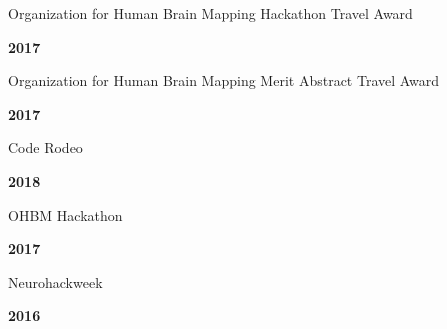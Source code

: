 \documentclass[10pt]{article}
\newcommand{\sectionstyle}{\LARGE \fontfamily{lmr}\selectfont}
\begin{document}
\bigskip

\begin{center}\sectionstyle{HONORS AND AWARDS}\end{center}

\begin{minipage}[t]{.85\linewidth}
\flushleft
\noindent
Organization for Human Brain Mapping Hackathon Travel Award
\end{minipage}
\hfill
\begin{minipage}[t]{.15\linewidth}
\flushright
\noindent
\textsc{\textbf{2017}}
\end{minipage}

\begin{minipage}[t]{.85\linewidth}
\flushleft
\noindent
Organization for Human Brain Mapping Merit Abstract Travel Award
\end{minipage}
\hfill
\begin{minipage}[t]{.15\linewidth}
\flushright
\noindent
\textsc{\textbf{2017}}
\end{minipage}

\bigskip

\begin{center}\sectionstyle{HACKATHONS}\end{center}

\begin{minipage}[t]{.85\linewidth}
\flushleft
\noindent
Code Rodeo
\end{minipage}
\hfill
\begin{minipage}[t]{.15\linewidth}
\flushright
\noindent
\textsc{\textbf{2018}}
\end{minipage}

\begin{minipage}[t]{.85\linewidth}
\flushleft
\noindent
OHBM Hackathon
\end{minipage}
\hfill
\begin{minipage}[t]{.15\linewidth}
\flushright
\noindent
\textsc{\textbf{2017}}
\end{minipage}

\begin{minipage}[t]{.85\linewidth}
\flushleft
\noindent
Neurohackweek
\end{minipage}
\hfill
\begin{minipage}[t]{.15\linewidth}
\flushright
\noindent
\textsc{\textbf{2016}}
\end{minipage}

\bigskip

\begin{center}\sectionstyle{ADDITIONAL TRAINING AND SKILLS}\end{center}
\end{document}
